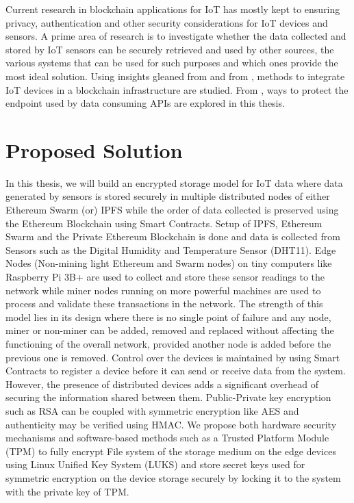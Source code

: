 \documentclass[11pt,openright]{report}
\begin{document}
Current research in blockchain applications for IoT has mostly kept to ensuring privacy, authentication and other security considerations \cite{8012302} for IoT devices and sensors. A prime area of research is to investigate whether the data collected and stored by IoT sensors can be securely retrieved and used by other sources, the various systems that can be used for such purposes and which ones provide the most ideal solution. Using insights gleaned from \cite{8094378} and from \cite{8634961}, methods to integrate IoT devices in a blockchain infrastructure are studied. From  \cite{8644498}, ways to protect the endpoint used by data consuming APIs are explored in this thesis.

\section{Proposed Solution}\label{section:proposed_solution}
In this thesis, we will build an encrypted storage model for IoT data where data generated by sensors is stored securely in multiple distributed nodes of either Ethereum Swarm (or) IPFS while the order of data collected is preserved using the Ethereum Blockchain using Smart Contracts. Setup of IPFS, Ethereum Swarm and the Private Ethereum Blockchain is done and data is collected from Sensors such as the Digital Humidity and Temperature Sensor (DHT11). Edge Nodes (Non-mining light Ethereum and Swarm nodes) on tiny computers like Raspberry Pi 3B+ are used to collect and store these sensor readings to the network while miner nodes running on more powerful machines are used to process and validate these transactions in the network. The strength of this model lies in its design where there is no single point of failure and any node, miner or non-miner can be added, removed and replaced without affecting the functioning of the overall network, provided another node is added before the previous one is removed. Control over the devices is maintained by using Smart Contracts to register a device \cite{zhang2018smart} before it can send or receive data from the system. However, the presence of distributed devices adds a significant overhead of securing the information shared between them. Public-Private key encryption such as RSA can be coupled with symmetric encryption like AES and authenticity may be verified using HMAC. We propose both hardware security mechanisms and software-based methods such as a Trusted Platform Module (TPM) to fully encrypt File system of the storage medium on the edge devices using Linux Unified Key System (LUKS) and store secret keys used for symmetric encryption on the device storage securely by locking it to the system with the private key of TPM.
\end{document}
